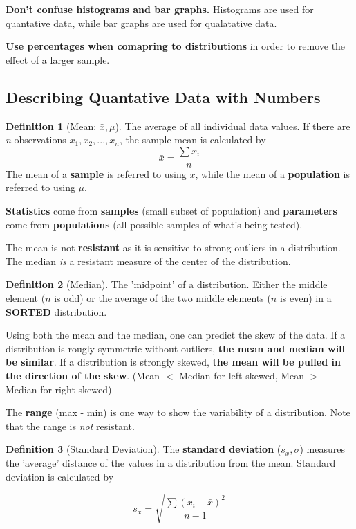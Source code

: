 \documentclass[12pt, a4paper]{article}
\theoremstyle{definition}
\newtheorem{definition}{Definition}
\begin{document}
\textbf{Don't confuse histograms and bar graphs.} Histograms are used for quantative data, while bar graphs are used for qualatative data.

\textbf{Use percentages when comapring to distributions} in order to remove the effect of a larger sample.

\subsection{Describing Quantative Data with Numbers}
\begin{definition}[Mean: $\bar{x}, \mu$]
    The average of all individual data values. If there are \textit{n} observations $x_1, x_2, ..., x_n$, the sample mean is calculated by
    \[\bar{x} = \frac{\sum x_i}{n}\]
    The mean of a \textbf{sample} is referred to using $\bar{x}$, while the mean of a \textbf{population} is referred to using $\mu$.
\end{definition}

\textbf{Statistics} come from \textbf{samples} (small subset of population) and \textbf{parameters} come from \textbf{populations} (all possible samples of what's being tested).

The mean is not \textbf{resistant} as it is sensitive to strong outliers in a distribution. The median \textit{is} a resistant measure of the center of the distribution.

\begin{definition}[Median]
    The 'midpoint' of a distribution. Either the middle element ($n$ is odd) or the average of the two middle elements ($n$ is even) in a \textbf{SORTED} distribution.
\end{definition}

Using both the mean and the median, one can predict the skew of the data. If a distribution is rougly symmetric without outliers, \textbf{the mean and median will be similar}. If a distribution is strongly skewed, \textbf{the mean will be pulled in the direction of the skew}. (Mean $<$ Median for left-skewed, Mean $>$ Median for right-skewed)

The \textbf{range} (max - min) is one way to show the variability of a distribution. Note that the range is \textit{not} resistant.

\begin{definition}[Standard Deviation]
    The \textbf{standard deviation} ($s_x, \sigma$) measures the 'average' distance of the values in a distribution from the mean. Standard deviation is calculated by

    \[s_x = \sqrt{\frac{\sum{(x_i - \bar{x})^2}}{n - 1}}\]
\end{definition}
\end{document}
